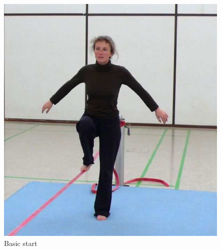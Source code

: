 \begin{figure}[htb]
	\centering
	\begin{minipage}[t]{0.30\linewidth}
		\centering
		\includegraphics[width=1\linewidth]{Pictures/slacklineBasicStart}
		\caption{Basic start \cite{Kroiss2007-ab}}
		\label{fig:slacklineBasicStart}
	\end{minipage}
	\hfill
	\begin{minipage}[t]{0.20\linewidth}
		\centering

\end{minipage}
\end{figure}
